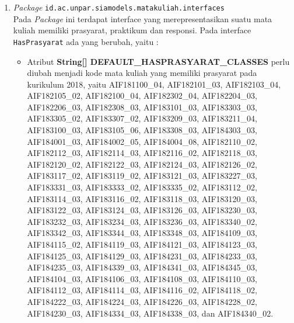 \begin{enumerate}
	\item \textit{Package} \texttt{id.ac.unpar.siamodels.matakuliah.interfaces}\\
	Pada \textit{Package} ini terdapat interface yang merepresentasikan suatu mata kuliah memiliki prasyarat, praktikum dan responsi. Pada interface \texttt{HasPrasyarat} ada yang berubah, yaitu :
	\begin{itemize}
		\item Atribut \textbf{String[] DEFAULT\_HASPRASYARAT\_CLASSES} perlu diubah menjadi kode mata kuliah yang memiliki prasyarat pada kurikulum 2018, yaitu AIF181100\_04, AIF182101\_03,
		AIF182103\_04, AIF182105\_02, AIF182100\_04, AIF182302\_04,
		AIF182204\_03, AIF182206\_03, AIF182308\_03, AIF183101\_03,
		AIF183303\_03, AIF183305\_02, AIF183307\_02, AIF183209\_03,
		AIF183211\_04, AIF183100\_03, AIF183105\_06, AIF183308\_03,
		AIF184303\_03, AIF184001\_03, AIF184002\_05, AIF184004\_08,
		AIF182110\_02, AIF182112\_03, AIF182114\_03, AIF182116\_02,
		AIF182118\_03, AIF182120\_02, AIF182122\_03, AIF182124\_03,
		AIF182126\_02, AIF183117\_02,	AIF183119\_02, AIF183121\_03,
		AIF183227\_03, AIF183331\_03, AIF183333\_02, AIF183335\_02,
		AIF183112\_02, AIF183114\_03, AIF183116\_02, AIF183118\_03,
		AIF183120\_03, AIF183122\_03,	AIF183124\_03, AIF183126\_03,
		AIF183230\_03, AIF183232\_03, AIF183234\_03, AIF183236\_03,
		AIF183340\_02, AIF183342\_03, AIF183344\_03, AIF183348\_03,
		AIF184109\_03, AIF184115\_02,	AIF184119\_03, AIF184121\_03,
		AIF184123\_03, AIF184125\_03, AIF184129\_03, AIF184231\_03,
		AIF184233\_03, AIF184235\_03, AIF184339\_03, AIF184341\_03,
		AIF184345\_03, AIF184104\_03,	AIF184106\_03, AIF184108\_03,
		AIF184110\_03, AIF184112\_03, AIF184114\_03, AIF184116\_02,
		AIF184118\_02, AIF184222\_03, AIF184224\_03, AIF184226\_03,
		AIF184228\_02, AIF184230\_03,	AIF184334\_03, AIF184338\_03, dan AIF184340\_02.
	\end{itemize}
	

\end{enumerate}
